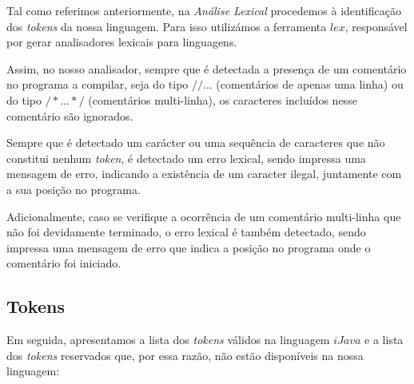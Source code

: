 \documentclass[11pt,a4paper]{article}
\begin{document}
Tal como referimos anteriormente, na \emph{Análise Lexical} procedemos à identificação dos \emph{tokens} da nossa linguagem. Para isso utilizámos a ferramenta $lex$, responsável por gerar analisadores lexicais para linguagens.

Assim, no nosso analisador, sempre que é detectada a presença de um comentário no programa a compilar, seja do tipo $// ...$ (comentários de apenas uma linha) ou do tipo $/* ... */$ (comentários multi-linha), os caracteres incluídos nesse comentário são ignorados.

Sempre que é detectado um carácter ou uma sequência de caracteres que não constitui nenhum \emph{token}, é detectado um erro lexical, sendo impressa uma mensagem de erro, indicando a existência de um caracter ilegal, juntamente com a sua posição no programa.

Adicionalmente, caso se verifique a ocorrência de um comentário multi-linha que não foi devidamente terminado, o erro lexical é também detectado, sendo impressa uma mensagem de erro que indica a posição no programa onde o comentário foi iniciado.

	\subsection{Tokens}

	Em seguida, apresentamos a lista dos \emph{tokens} válidos na linguagem $iJava$ e a lista dos \emph{tokens} reservados que, por essa razão, não estão disponíveis na nossa linguagem:
	
\end{document}
